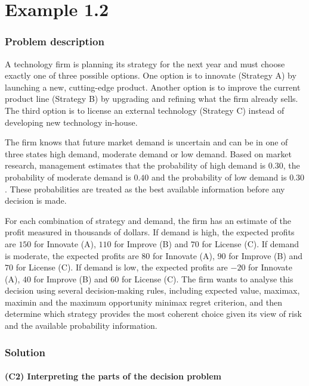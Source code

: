 \chapter{Example 1.2}\label{example-1-2}
	
	\subsection{Problem description}\label{example-1-problem}
	
	A technology firm is planning its strategy for the next year and must choose exactly one of three possible options.
	One option is to innovate (Strategy A) by launching a new, cutting-edge product. Another option is to improve the current product line
	(Strategy B) by upgrading and refining what the firm already sells. The third option is to license an external technology (Strategy C)
	instead of developing new technology in-house.
	
	The firm knows that future market demand is uncertain and can be in one of three states high demand, moderate demand or low demand.
	Based on market research, management estimates that the probability of high demand is \(0.30\), the probability of moderate demand is \(0.40\)
	and the probability of low demand is \(0.30\). These probabilities are treated as the best available information before any decision is made.
	
	For each combination of strategy and demand, the firm has an estimate of the profit measured in thousands of dollars.
	If demand is high, the expected profits are \(150\) for Innovate (A), \(110\) for Improve (B) and \(70\) for License (C).
	If demand is moderate, the expected profits are \(80\) for Innovate (A), \(90\) for Improve (B) and \(70\) for License (C).
	If demand is low, the expected profits are \(-20\) for Innovate (A), \(40\) for Improve (B) and \(60\) for License (C).
	The firm wants to analyse this decision using several decision-making rules, including expected value, maximax, maximin
	and the maximum opportunity minimax regret criterion, and then determine which strategy provides the most coherent choice
	given its view of risk and the available probability information.
	
	\subsection{Solution}
	
	\subsubsection{(C2) Interpreting the parts of the decision problem}\label{example-1-c2}
	
